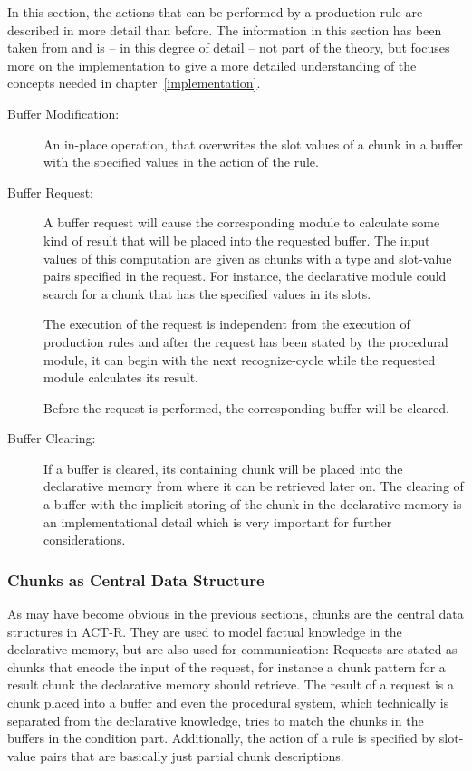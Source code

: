 In this section, the actions that can be performed by a production rule are described in more detail than before. The information in this section has been taken from \cite[168\psqq]{actr_reference} and is -- in this degree of detail -- not part of the theory, but focuses more on the implementation to give a more detailed understanding of the concepts needed in chapter~\ref{implementation}.

\begin{description}
 \item[Buffer Modification:] 
 
 An in-place operation, that overwrites the slot values of a chunk in a buffer with the specified values in the action of the rule.
 
 \item[Buffer Request:] 
 
 A buffer request will cause the corresponding module to calculate some kind of result that will be placed into the requested buffer. The input values of this computation are given as chunks with a type and slot-value pairs specified in the request. For instance, the declarative module could search for a chunk that has the specified values in its slots.
 
 The execution of the request is independent from the execution of production rules and after the request has been stated by the procedural module, it can begin with the next recognize-cycle while the requested module calculates its result.
 
 Before the request is performed, the corresponding buffer will be cleared.
 
 \item[Buffer Clearing:] 
 
 If a buffer is cleared, its containing chunk will be placed into the declarative memory from where it can be retrieved later on. The clearing of a buffer with the implicit storing of the chunk in the declarative memory is an implementational detail which is very important for further considerations.
\end{description}

\subsubsection{Chunks as Central Data Structure}

As may have become obvious in the previous sections, chunks are the central data structures in ACT-R. They are used to model factual knowledge in the declarative memory, but are also used for communication: Requests are stated as chunks that encode the input of the request, for instance a chunk pattern for a result chunk the declarative memory should retrieve. The result of a request is a chunk placed into a buffer and even the procedural system, which technically is separated from the declarative knowledge, tries to match the chunks in the buffers in the condition part. Additionally, the action of a rule is specified by slot-value pairs that are basically just partial chunk descriptions. 

